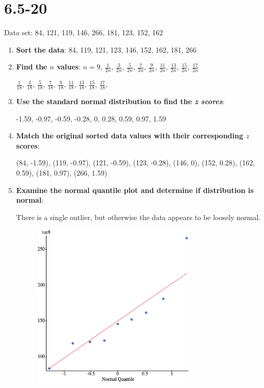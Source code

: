 \documentclass[12pt,fleqn]{article}
\newcommand{\chapter}{6.5}
\newcommand{\problem}[1]{\vspace{5ex}\section*{\chapter-#1}}
\begin{document}
\pagebreak
\problem{20}
Data set: 84, 121, 119, 146, 266, 181, 123, 152, 162

\begin{enumerate}
\item \textbf{Sort the data}: 84, 119, 121, 123, 146, 152, 162, 181, 266

\item \textbf{Find the $n$ values}:
  $n = 9$,
  $\frac{1}{2n} \text{, }
  \frac{3}{2n} \text{, }
  \frac{5}{2n} \text{, }
  \frac{7}{2n} \text{, }
  \frac{9}{2n} \text{, }
  \frac{11}{2n} \text{, }
  \frac{13}{2n} \text{, }
  \frac{15}{2n} \text{, }
  \frac{17}{2n}$

  $\frac{1}{18} \text{, }
  \frac{3}{18} \text{, }
  \frac{5}{18} \text{, }
  \frac{7}{18} \text{, }
  \frac{9}{18} \text{, }
  \frac{11}{18} \text{, }
  \frac{13}{18} \text{, }
  \frac{15}{18} \text{, }
  \frac{17}{18} \text{, } $

\item \textbf{Use the standard normal distribution to find the \textit{z scores}}:

-1.59, -0.97, -0.59, -0.28, 0, 0.28, 0.59, 0.97, 1.59

\item \textbf{Match the original sorted data values with their corresponding $z$ scores}:

(84, -1.59), (119, -0.97), (121, -0.59), (123, -0.28), (146, 0), (152, 0.28), (162, 0.59), (181, 0.97), (266, 1.59)

\item \textbf{Examine the normal quantile plot and determine if distribution is normal}:

There is a single outlier, but otherwise the data appears to be loosely normal.
\begin{figure}[ht]
  \centering
  \includegraphics[width=8cm]{assets/fast-food.png}
\end{figure}
\end{enumerate}
\end{document}
